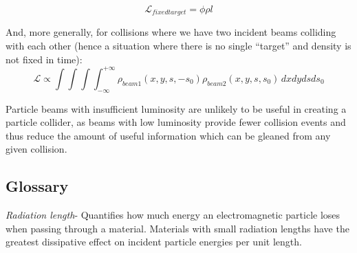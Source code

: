 \documentclass{article}
\begin{document}
	$$\mathcal{L}_{fixed target} = \phi \rho l$$
	
	\par And, more generally, for collisions where we have two incident beams colliding with each other (hence a situation where there is no single “target” and density is not fixed in time):
	$$\mathcal{L} \propto  \int\int\int\int_{-\infty}^{+\infty} \rho_{beam1}(x,y,s,-s_0)\rho_{beam2}(x,y,s,s_0) \,dxdydsds_0 $$
	
	\par Particle beams with insufficient luminosity are unlikely to be useful in creating a particle collider, as beams with low luminosity provide fewer collision events and thus reduce the amount of useful information which can be gleaned from any given collision.
	
	
	\subsection{Glossary}
	\par \textit{Radiation length}- Quantifies how much energy an electromagnetic particle loses when passing through a material. Materials with small radiation lengths have the greatest dissipative effect on incident particle energies per unit length.
	
\end{document}
